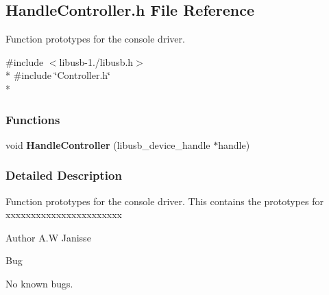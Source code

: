 \subsection{Handle\-Controller.\-h File Reference}
\label{_handle_controller_8h}


Function prototypes for the console driver.  


{\ttfamily \#include $<$libusb-\/1./libusb.\-h$>$}\\*
{\ttfamily \#include \char`\"{}Controller.\-h\char`\"{}}\\*
\subsubsection*{Functions}
\begin{DoxyCompactItemize}
\item 
void {\bfseries Handle\-Controller} (libusb\-\_\-device\-\_\-handle $\ast$handle)\label{_handle_controller_8h_ae75a18b65c6212d966c24396232cf2a6}

\end{DoxyCompactItemize}


\subsubsection{Detailed Description}
Function prototypes for the console driver. This contains the prototypes for xxxxxxxxxxxxxxxxxxxxxxx

\begin{DoxyAuthor}{Author}
A.\-W Janisse 
\end{DoxyAuthor}
\begin{DoxyRefDesc}{Bug}
\item[{\bf Bug}]No known bugs. \end{DoxyRefDesc}
